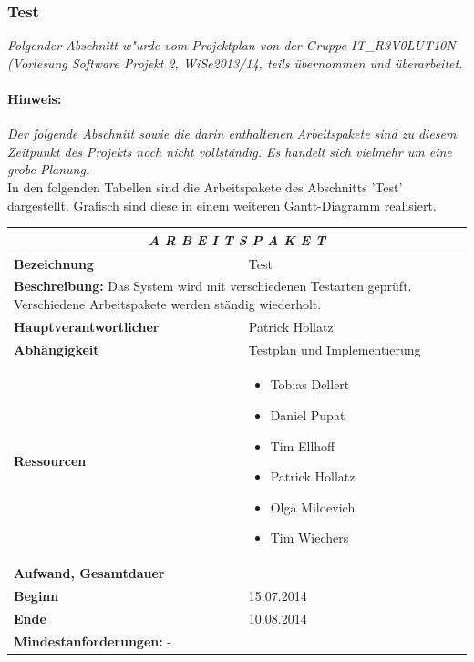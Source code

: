 \documentclass[fontsize=12pt,paper=a4,twoside]{scrartcl}
\begin{document}
\subsubsection{Test}\label{aps}

\textit{Folgender Abschnitt w"urde vom Projektplan von der Gruppe IT\_R3V0LUT10N (Vorlesung Software Projekt 2, WiSe2013/14, teils übernommen und überarbeitet.}

\paragraph{Hinweis:} \textit{Der folgende Abschnitt sowie die darin enthaltenen Arbeitspakete sind zu diesem Zeitpunkt des Projekts noch nicht vollständig. Es handelt sich vielmehr um eine grobe Planung.}\\

In den folgenden Tabellen sind die Arbeitspakete des Abschnitts 'Test' dargestellt. Grafisch sind diese in einem weiteren Gantt-Diagramm realisiert.

\begin{tabular}{p{7.5cm}|p{7.5cm}}\toprule
\multicolumn{2}{c}{\textbf{\textit{A R B E I T S P A K E T \quad 5}}} \\ \toprule \hline
\textbf{Bezeichnung} & Test\\\hline
\multicolumn{2}{p{15cm}}{\textbf{Beschreibung:} \newline 
Das System wird mit verschiedenen Testarten geprüft. Verschiedene Arbeitspakete werden ständig wiederholt. }  \\\hline
\textbf{Hauptverantwortlicher} & Patrick Hollatz \\\hline
\textbf{Abhängigkeit} & Testplan und Implementierung\\\hline
\textbf{Ressourcen} & \begin{itemize} 
\itemsep0pt
\item Tobias Dellert
\item Daniel Pupat
\item Tim Ellhoff
\item Patrick Hollatz
\item Olga Miloevich
\item Tim Wiechers
\end{itemize} \\\hline
\textbf{Aufwand, Gesamtdauer} & \\\hline
\textbf{Beginn} & 15.07.2014 \\\hline
\textbf{Ende} & 10.08.2014\\\hline
\multicolumn{2}{p{15cm}}{\textbf{Mindestanforderungen: } \newline
 - }  \\ \toprule
\end{tabular} \\\\
\end{document}
